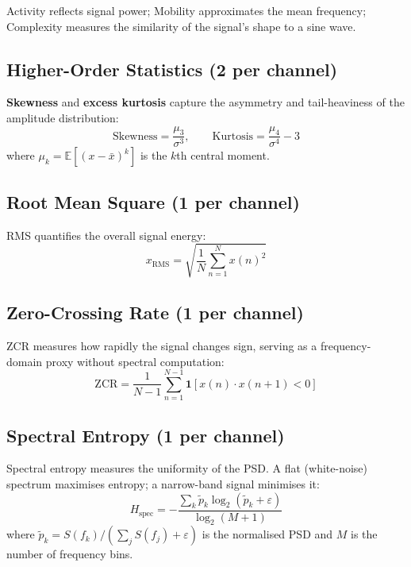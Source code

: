 \documentclass[12pt, a4paper]{report}
\begin{document}
Activity reflects signal power; Mobility approximates the mean frequency;
Complexity measures the similarity of the signal's shape to a sine wave.

\subsection{Higher-Order Statistics (2 per channel)}

\textbf{Skewness} and \textbf{excess kurtosis} capture the asymmetry and
tail-heaviness of the amplitude distribution:
\begin{equation}
  \text{Skewness} = \frac{\mu_3}{\sigma^3}, \qquad
  \text{Kurtosis} = \frac{\mu_4}{\sigma^4} - 3
  \label{eq:highorder}
\end{equation}
where $\mu_k = \mathbb{E}[(x - \bar{x})^k]$ is the $k$th central moment.

\subsection{Root Mean Square (1 per channel)}

RMS quantifies the overall signal energy:
\begin{equation}
  x_{\text{RMS}} = \sqrt{\frac{1}{N}\sum_{n=1}^{N} x(n)^2}
  \label{eq:rms}
\end{equation}

\subsection{Zero-Crossing Rate (1 per channel)}

ZCR measures how rapidly the signal changes sign, serving as a
frequency-domain proxy without spectral computation:
\begin{equation}
  \text{ZCR} = \frac{1}{N-1}\sum_{n=1}^{N-1}
               \mathbf{1}\!\left[x(n)\cdot x(n+1) < 0\right]
  \label{eq:zcr}
\end{equation}

\subsection{Spectral Entropy (1 per channel)}

Spectral entropy measures the uniformity of the PSD. A flat (white-noise)
spectrum maximises entropy; a narrow-band signal minimises it:
\begin{equation}
  H_{\text{spec}} = -\frac{\displaystyle\sum_{k} \tilde{p}_k \log_2(\tilde{p}_k + \varepsilon)}
                          {\log_2(M + 1)}
  \label{eq:specent}
\end{equation}
where $\tilde{p}_k = S(f_k)/(\sum_j S(f_j) + \varepsilon)$ is the
normalised PSD and $M$ is the number of frequency bins.
\end{document}
